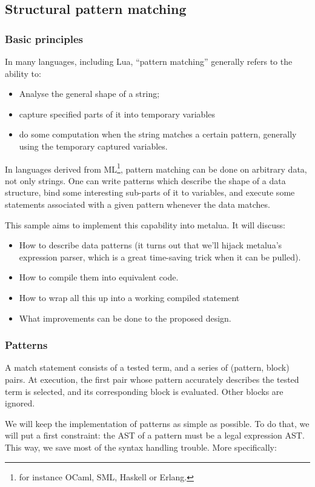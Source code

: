 \subsection{Structural pattern matching}
\subsubsection{Basic principles}
In many languages, including Lua, ``pattern matching'' generally
refers to the ability to:
\begin{itemize}
\item Analyse the general shape of a string;
\item capture specified parts of it into temporary variables
\item do some computation when the string matches a certain pattern,
  generally using the temporary captured variables.
\end{itemize}

In languages derived from ML\footnote{for instance OCaml, SML, Haskell
  or Erlang.}, pattern matching can be done on arbitrary data, not
only strings. One can write patterns which describe the shape of a
data structure, bind some interesting sub-parts of it to variables,
and execute some statements associated with a given pattern whenever
the data matches.

This sample aims to implement this capability into metalua. It will
discuss:
\begin{itemize}
\item How to describe data patterns (it turns out that we'll hijack
  metalua's expression parser, which is a great time-saving trick when
  it can be pulled).
\item How to compile them into equivalent code.
\item How to wrap all this up into a working compiled statement
\item What improvements can be done to the proposed design.
\end{itemize}

\subsubsection{Patterns}
A match statement consists of a tested term, and a series of (pattern,
block) pairs. At execution, the first pair whose pattern accurately
describes the tested term is selected, and its corresponding block is
evaluated. Other blocks are ignored. 

We will keep the implementation of patterns as simple as possible. To
do that, we will put a first constraint: the AST of a pattern must be
a legal expression AST. This way, we save most of the syntax handling
trouble. More specifically:

